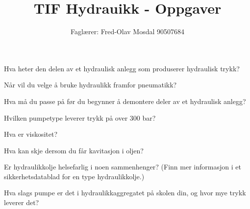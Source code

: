 \documentclass[12pt,a4paper]{article}
\def\oppgave{
		}
\begin{document}
\title{TIF Hydrauikk - Oppgaver}
\author{Faglærer: Fred-Olav Mosdal 90507684\\}
\maketitle
\oppgave{}%
\vskip 2.5pt 
Hva heter den delen av et hydraulisk anlegg som produserer hydraulisk trykk?
\vskip 5pt 
\vskip 2.5pt 
\oppgave{}%
\vskip 2.5pt 
Når vil du velge å bruke hydraulikk framfor pneumatikk?
\vskip 5pt 
\vskip 2.5pt 
\oppgave{}%
\vskip 2.5pt 
Hva må du passe på før du begynner å demontere deler av et hydraulisk anlegg?
\vskip 5pt 
\vskip 2.5pt 
\oppgave{}%
\vskip 2.5pt 
Hvilken pumpetype leverer trykk på over 300 bar?
\vskip 5pt 
\vskip 2.5pt 
\oppgave{}%
\vskip 2.5pt 
Hva er viskositet?
\vskip 5pt 
\vskip 2.5pt 
\oppgave{}%
\vskip 2.5pt 
Hva kan skje dersom du får kavitasjon i oljen?
\vskip 5pt 
\vskip 2.5pt 
\oppgave{}%
\vskip 2.5pt 
Er hydraulikkolje helsefarlig i noen sammenhenger? (Finn mer informasjon i et sikkerhetsdatablad for en type hydraulikkolje.)
\vskip 5pt 
\vskip 2.5pt 
\oppgave{}%
\vskip 2.5pt 
Hva slags pumpe er det i hydraulikkaggregatet på skolen din, og hvor mye trykk leverer det?
\vskip 5pt 
\end{document}
